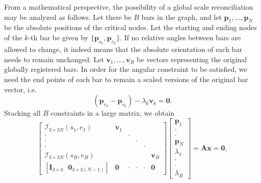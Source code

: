 \documentclass[letterpaper, 10 pt, conference]{ieeeconf}  %
\begin{document}
From a mathematical perspective, the possibility of a global scale reconciliation may be analyzed as follows. Let there be $B$ bars in the graph, and let $\mathbf{p}_1,\ldots,\mathbf{p}_N$ be the absolute positions of the critical nodes. Let the starting and ending nodes of the $k$-th bar be given by $\{\mathbf{p}_{s_k},\mathbf{p}_{e_k}\}$. If no relative angles between bars are allowed to change, it indeed means that the absolute orientation of each bar needs to remain unchanged. Let $\mathbf{v}_1,\ldots,\mathbf{v}_B$ be vectors representing the original globally registered bars. In order for the angular constraint to be satisfied, we need the end points of each bar to remain a scaled versions of the original bar vector, i.e.
%
\begin{equation}
    (\mathbf{p}_{e_k} - \mathbf{p}_{s_k}) - \lambda_k \mathbf{v}_k = \mathbf{0}.
\end{equation}
%
Stacking all $B$ constraints in a large matrix, we obtain
%
\small
\begin{equation}
  \left[ \begin{matrix}
    \mathcal{I}_{3\times 3N}(s_1,e_1) & \mathbf{v}_1 &       &       &       &              \\
    \cdot                             &              & \cdot &       &       &              \\
    \cdot                             &              &       & \cdot &       &              \\
    \cdot                             &              &       &       & \cdot &              \\
    \mathcal{I}_{3\times 3N}(s_B,e_B) &              &       &       &       & \mathbf{v}_B \\
    \left[ \mathbf{I}_{3\times 3} \text{ } \mathbf{0}_{3\times 3(N-1)} \right] & \mathbf{0} & \cdot & \cdot & \cdot & \mathbf{0}
  \end{matrix} \right]
  \left[ \begin{matrix} \mathbf{p}_1 \\ \cdot \\ \cdot \\ \mathbf{p}_N \\ \lambda_1 \\ \cdot \\ \cdot \\ \lambda_B \end{matrix}  \right] = \mathbf{A} \mathbf{x} = \mathbf{0},
  \label{equ:evaluation_matrix}
\end{equation}
\end{document}
